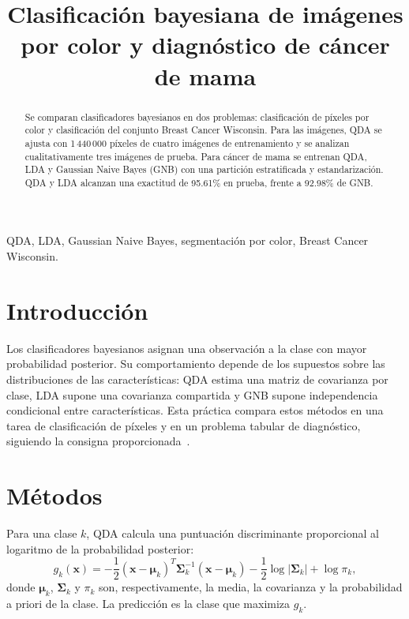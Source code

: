 \documentclass[conference]{IEEEtran}
\title{Clasificación bayesiana de imágenes por color y diagnóstico de cáncer de mama}
\author{\IEEEauthorblockN{Nombre del estudiante}
\IEEEauthorblockA{Reconocimiento de Patrones}}
\begin{document}
\maketitle
\raggedbottom

\begin{abstract}
Se comparan clasificadores bayesianos en dos problemas: clasificación de píxeles por color y clasificación del conjunto Breast Cancer Wisconsin. Para las imágenes, QDA se ajusta con 1\,440\,000 píxeles de cuatro imágenes de entrenamiento y se analizan cualitativamente tres imágenes de prueba. Para cáncer de mama se entrenan QDA, LDA y Gaussian Naive Bayes (GNB) con una partición estratificada y estandarización. QDA y LDA alcanzan una exactitud de 95.61\% en prueba, frente a 92.98\% de GNB.
\end{abstract}

\begin{IEEEkeywords}
QDA, LDA, Gaussian Naive Bayes, segmentación por color, Breast Cancer Wisconsin.
\end{IEEEkeywords}

\section{Introducción}
Los clasificadores bayesianos asignan una observación a la clase con mayor probabilidad posterior. Su comportamiento depende de los supuestos sobre las distribuciones de las características: QDA estima una matriz de covarianza por clase, LDA supone una covarianza compartida y GNB supone independencia condicional entre características. Esta práctica compara estos métodos en una tarea de clasificación de píxeles y en un problema tabular de diagnóstico, siguiendo la consigna proporcionada~\cite{practica}.

\section{Métodos}
Para una clase $k$, QDA calcula una puntuación discriminante proporcional al logaritmo de la probabilidad posterior:
\begin{equation}
g_k(\mathbf{x})=-\frac{1}{2}(\mathbf{x}-\boldsymbol{\mu}_k)^T\boldsymbol{\Sigma}_k^{-1}(\mathbf{x}-\boldsymbol{\mu}_k)-\frac{1}{2}\log|\boldsymbol{\Sigma}_k|+\log\pi_k,
\end{equation}
donde $\boldsymbol{\mu}_k$, $\boldsymbol{\Sigma}_k$ y $\pi_k$ son, respectivamente, la media, la covarianza y la probabilidad a priori de la clase. La predicción es la clase que maximiza $g_k$.
\end{document}
